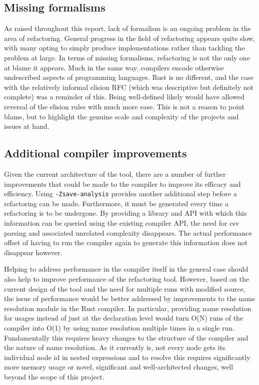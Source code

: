 \subsection{Missing formalisms}
As raised throughout this report, lack of formalism is an ongoing problem in the area of refactoring. General progress in the field of refactoring appears quite slow, with many opting to simply produce implementations rather than tackling the problem at large. In terms of missing formalisms, refactoring is not the only one at blame it appears. Much in the same way, compilers encode otherwise undescribed aspects of programming languages. Rust is no different, and the case with the relatively informal elision RFC (which was descriptive but definitely not complete) was a reminder of this. Being well-defined likely would have allowed reversal of the elision rules with much more ease. This is not a reason to point blame, but to highlight the genuine scale and complexity of the projects and issues at hand. 

\subsection{Additional compiler improvements}
Given the current architecture of the tool, there are a number of further improvements that could be made to the compiler to improve its efficacy and efficiency. Using {\verb|-Zsave-analysis|} provides another additional step before a refactoring can be made. Furthermore, it must be generated every time a refactoring is to be undergone. By providing a library and API with which this information can be queried using the existing compiler API, the need for csv parsing and associated unrelated complexity disappears. The actual performance offset of having to run the compiler again to generate this information does not disappear however.  



Helping to address performance in the compiler itself in the general case should also help to improve performance of the refactoring tool. However, based on the current design of the tool and the need for multiple runs with modified source, the issue of performance would be better addressed by improvements to the name resolution module in the Rust compiler. In particular, providing name resolution for usages instead of just at the declaration level would turn O(N) runs of the compiler into O(1) by using name resolution multiple times in a single run. Fundamentally this requires heavy changes to the structure of the compiler and the nature of name resolution. As it currently is, not every node gets its individual node id in nested expressions and to resolve this requires significantly more memory usage or novel, significant and well-architected changes, well beyond the scope of this project.

